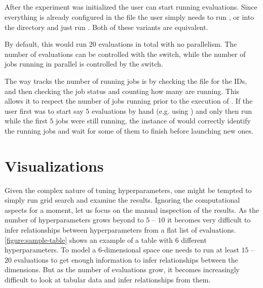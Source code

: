 \subsection{}

After the experiment was initialized the user can start running evaluations. Since everything is already configured in the  file the user simply needs to run , or  into the directory and just run . Both of these variants are equivalent.

By default, this would run $20$ evaluations in total with no parallelism. The number of evaluations can be controlled with the  switch, while the number of jobs running in parallel is controlled by the  switch.

The way  tracks the number of running jobs is by checking the  file for the IDs, and then checking the job status and counting how many are running. This allows it to respect the number of jobs running prior to the execution of . If the user first was to start say $5$ evaluations by hand (e.g. using ) and only then run  while the first $5$ jobs were still running, the instance of  would correctly identify the running jobs and wait for some of them to finish before launching new ones.

\section{Visualizations}
\label{section:visualizations}

Given the complex nature of tuning hyperparameters, one might be tempted to simply run grid search and examine the results. Ignoring the computational aspects for a moment, let us focus on the manual inspection of the results. As the number of hyperparameters grows beyond to $5$ -- $10$ it becomes very difficult to infer relationships between hyperparameters from a flat list of evaluations. \autoref{figure:sample-table} shows an example of a table with $6$ different hyperparameters. To model a $6$-dimensional space one needs to run at least $15$ -- $20$ evaluations to get enough information to infer relationships between the dimensions. But as the number of evaluations grow, it becomes increasingly difficult to look at tabular data and infer relationships from them.


